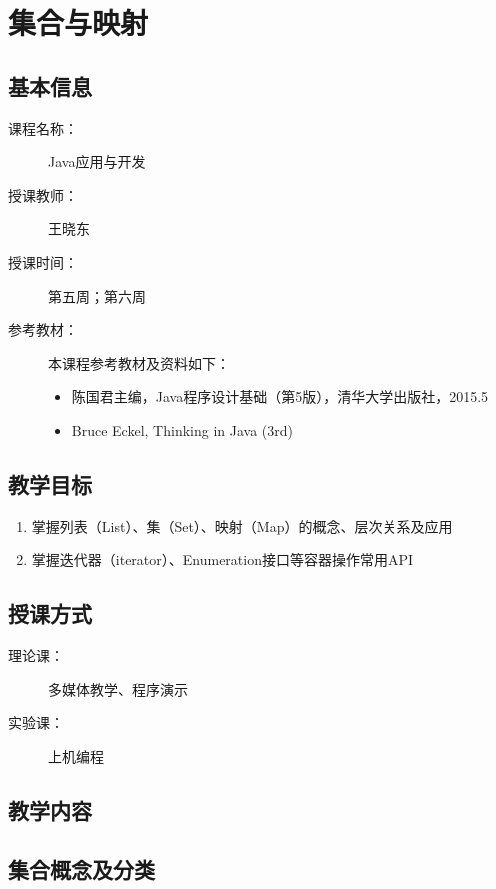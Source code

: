 \chapter{集合与映射}
\label{chp:Set-list-map}

\section*{基本信息}
\sline
\begin{description}
\item[课程名称：] Java应用与开发
\item[授课教师：] 王晓东
\item[授课时间：] 第五周；第六周
\item[参考教材：] 本课程参考教材及资料如下：
  \begin{itemize}
  \item 陈国君主编，Java程序设计基础（第5版），清华大学出版社，2015.5
  \item Bruce Eckel, Thinking in Java (3rd)
  \end{itemize}
\end{description}

\section*{教学目标}

\sline

\begin{enumerate}
\item 掌握列表（List）、集（Set）、映射（Map）的概念、层次关系及应用
\item 掌握迭代器（iterator）、Enumeration接口等容器操作常用API
\end{enumerate}

\section*{授课方式}

\sline
\begin{description}
\item[理论课：] 多媒体教学、程序演示
\item[实验课：] 上机编程
\end{description}

\newpage
\section*{教学内容}
\sline

\section{集合概念及分类}


